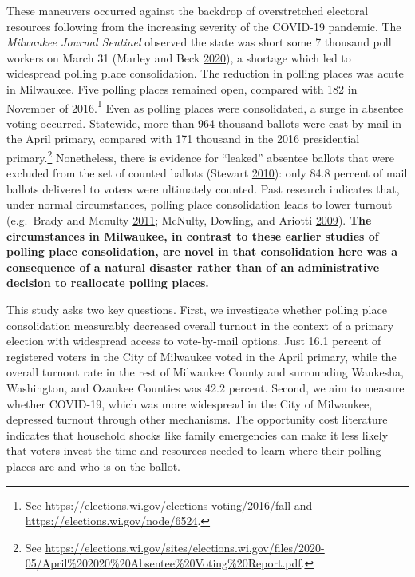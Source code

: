 \documentclass[
  12pt,
]{article}
\begin{document}
These maneuvers occurred against the backdrop of overstretched electoral resources following from the increasing severity of the COVID-19 pandemic. The \emph{Milwaukee Journal Sentinel} observed the state was short some 7 thousand poll workers on March 31 (Marley and Beck \protect\hyperlink{ref-Marley2020}{2020}), a shortage which led to widespread polling place consolidation. The reduction in polling places was acute in Milwaukee. Five polling places remained open, compared with 182 in November of 2016.\footnote{See \url{https://elections.wi.gov/elections-voting/2016/fall} and \url{https://elections.wi.gov/node/6524}.} Even as polling places were consolidated, a surge in absentee voting occurred. Statewide, more than 964 thousand ballots were cast by mail in the April primary, compared with 171 thousand in the 2016 presidential primary.\footnote{See \url{https://elections.wi.gov/sites/elections.wi.gov/files/2020-05/April\%202020\%20Absentee\%20Voting\%20Report.pdf}.} Nonetheless, there is evidence for ``leaked'' absentee ballots that were excluded from the set of counted ballots (Stewart \protect\hyperlink{ref-Stewart2010}{2010}): only 84.8 percent of mail ballots delivered to voters were ultimately counted. Past research indicates that, under normal circumstances, polling place consolidation leads to lower turnout (e.g.~Brady and Mcnulty \protect\hyperlink{ref-Brady2011}{2011}; McNulty, Dowling, and Ariotti \protect\hyperlink{ref-McNulty2009}{2009}). \textbf{The circumstances in Milwaukee, in contrast to these earlier studies of polling place consolidation, are novel in that consolidation here was a consequence of a natural disaster rather than of an administrative decision to reallocate polling places.}

This study asks two key questions. First, we investigate whether polling place consolidation measurably decreased overall turnout in the context of a primary election with widespread access to vote-by-mail options. Just 16.1 percent of registered voters in the City of Milwaukee voted in the April primary, while the overall turnout rate in the rest of Milwaukee County and surrounding Waukesha, Washington, and Ozaukee Counties was 42.2 percent. Second, we aim to measure whether COVID-19, which was more widespread in the City of Milwaukee, depressed turnout through other mechanisms. The opportunity cost literature indicates that household shocks like family emergencies can make it less likely that voters invest the time and resources needed to learn where their polling places are and who is on the ballot.
\end{document}
